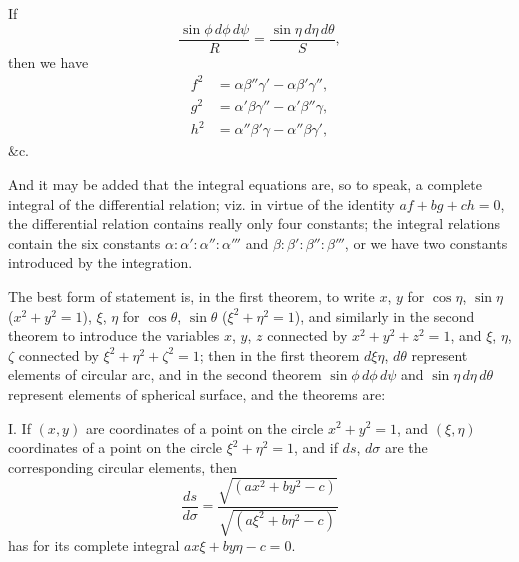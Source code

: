 \documentclass[11pt,a4paper]{article}
\begin{document}
If
\[
\frac{\sin\phi\,d\phi\,d\psi}{R}
  = \frac{\sin\eta\,d\eta\,d\theta}{S},
\]
then we have
\begin{align*}
f^2 &= \alpha\beta''\gamma' - \alpha\beta'\gamma'', \\
g^2 &= \alpha'\beta\gamma'' - \alpha'\beta''\gamma, \\
h^2 &= \alpha''\beta'\gamma - \alpha''\beta\gamma',
\end{align*}
$\&$c.

And it may be added that the integral equations are, so to speak, a complete
integral of the differential relation; viz. in virtue of the identity
$af+bg+ch=0$, the differential relation contains really only four constants;
the integral relations contain the six constants
$\alpha:\alpha':\alpha'':\alpha'''$ and $\beta:\beta':\beta'':\beta'''$, or we
have two constants introduced by the integration.

The best form of statement is, in the first theorem, to write $x$, $y$ for
$\cos\eta$, $\sin\eta$ ($x^2+y^2=1$), $\xi$, $\eta$ for $\cos\theta$,
$\sin\theta$ ($\xi^2+\eta^2=1$), and similarly in the second theorem to
introduce the variables $x$, $y$, $z$ connected by $x^2+y^2+z^2=1$, and
$\xi$, $\eta$, $\zeta$ connected by $\xi^2+\eta^2+\zeta^2=1$; then in the
first theorem $d\xi\eta$, $d\theta$ represent elements of circular arc, and
in the second theorem $\sin\phi\,d\phi\,d\psi$ and
$\sin\eta\,d\eta\,d\theta$ represent elements of spherical surface, and
the theorems are:

\medskip
\noindent\textsc{I.}\quad
If $(x,y)$ are coordinates of a point on the circle $x^2+y^2=1$, and
$(\xi,\eta)$ coordinates of a point on the circle $\xi^2+\eta^2=1$, and if
$ds$, $d\sigma$ are the corresponding circular elements, then
\[
\frac{ds}{d\sigma}
= \frac{\sqrt{(ax^2+by^2-c)}}{\sqrt{(a\xi^2+b\eta^2-c)}}
\]
has for its complete integral $ax\xi+by\eta-c=0$.
\end{document}
